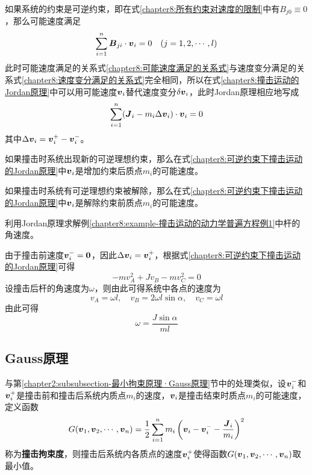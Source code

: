 如果系统的约束是可逆约束，即在式\eqref{chapter8:所有约束对速度的限制}中有$B_{j0}\equiv 0$，那么可能速度满足
\begin{equation}
	\sum_{i=1}^n \boldsymbol{B}_{ji}\cdot \boldsymbol{v}_i = 0\quad (j=1,2,\cdots,l)
	\label{chapter8:可能速度满足的关系式}
\end{equation}
此时可能速度满足的关系式\eqref{chapter8:可能速度满足的关系式}与速度变分满足的关系式\eqref{chapter8:速度变分满足的关系式}完全相同，所以在式\eqref{chapter8:撞击运动的Jordan原理}中可以用可能速度$\boldsymbol{v}_i$替代速度变分$\delta\boldsymbol{v}_i$，此时Jordan原理相应地写成
\begin{equation}
	\sum_{i=1}^n (\boldsymbol{J}_i-m_i\Delta\boldsymbol{v}_i) \cdot \boldsymbol{v}_i = 0
	\label{chapter8:可逆约束下撞击运动的Jordan原理}
\end{equation}
其中$\Delta\boldsymbol{v}_i = \boldsymbol{v}_i^+-\boldsymbol{v}_i^-$。

如果撞击时系统出现新的可逆理想约束，那么在式\eqref{chapter8:可逆约束下撞击运动的Jordan原理}中$\boldsymbol{v}_i$是增加约束后质点$m_i$的可能速度。

如果撞击时系统有可逆理想约束被解除，那么在式\eqref{chapter8:可逆约束下撞击运动的Jordan原理}中$\boldsymbol{v}_i$是解除约束前质点$m_i$的可能速度。

\begin{example}
利用Jordan原理求解例\ref{chapter8:example-撞击运动的动力学普遍方程例1}中杆的角速度。
\end{example}
\begin{solution}
由于撞击前速度$\boldsymbol{v}_i^-=\boldsymbol{0}$，因此$\Delta\boldsymbol{v}_i=\boldsymbol{v}_i^+$，根据式\eqref{chapter8:可逆约束下撞击运动的Jordan原理}可得
\begin{equation*}
	-mv_A^2 + Jv_B - mv_C^2 = 0
\end{equation*}
设撞击后杆的角速度为$\omega$，则由此可得系统中各点的速度为
\begin{equation*}
	v_A = \omega l,\quad v_B = 2\omega l\sin\alpha, \quad v_C = \omega l
\end{equation*}
由此可得
\begin{equation*}
	\omega = \frac{J\sin\alpha}{ml}
\end{equation*}
\end{solution}

\subsection{Gauss原理}

与第\ref{chapter2:subsubsection-最小拘束原理·Gauss原理}节中的处理类似，设$\boldsymbol{v}_i^-$和$\boldsymbol{v}_i^+$是撞击前和撞击后系统内质点$m_i$的速度，$\boldsymbol{v}_i$是撞击结束时质点$m_i$的可能速度，定义函数
\begin{equation}
	G(\boldsymbol{v}_1,\boldsymbol{v}_2,\cdots,\boldsymbol{v}_n) = \frac12 \sum_{i=1}^n m_i\left(\boldsymbol{v}_i-\boldsymbol{v}_i^- - \frac{\boldsymbol{J}_i}{m_i}\right)^2
	\label{chapter8:撞击拘束度的定义式}
\end{equation}
称为{\bf 撞击拘束度}，则撞击后系统内各质点的速度$\boldsymbol{v}_i^+$使得函数$G(\boldsymbol{v}_1,\boldsymbol{v}_2,\cdots,\boldsymbol{v}_n)$取最小值。

